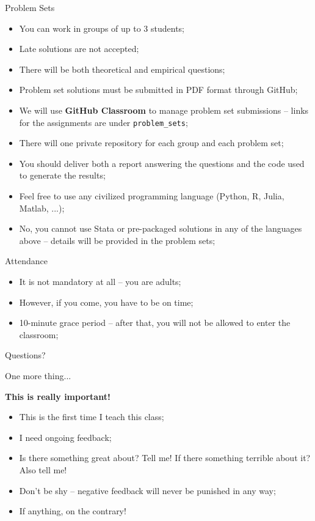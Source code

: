 \documentclass[aspectratio=169, xcolor=dvipsnames, 12pt]{beamer}
\begin{document}
\begin{frame}{Problem Sets}
\begin{itemize}
  \item You can work in groups of up to 3 students;
  \item Late solutions are not accepted;
  \item There will be both theoretical and empirical questions;
  \pause
  \item Problem set solutions must be submitted in PDF format through GitHub;
  \item We will use \textbf{GitHub Classroom} to manage problem set submissions -- links for the assignments are under \texttt{problem\_sets};
  \item There will one private repository for each group and each problem set;
  \item You should deliver both a report answering the questions and the code used to generate the results;
  \pause
  \item Feel free to use any civilized programming language (Python, R, Julia, Matlab, ...);
  \item No, you cannot use Stata or pre-packaged solutions in any of the languages above -- details will be provided in the problem sets;
\end{itemize}
\end{frame}

\begin{frame}{Attendance}
\begin{itemize}
  \item It is not mandatory at all -- you are adults;
  \item However, if you come, you have to be on time;
  \item 10-minute grace period -- after that, you will not be allowed to enter the classroom;
\end{itemize}
  
\end{frame}
\begin{frame}[standout]
Questions?
\end{frame}

\begin{frame}{One more thing...}
  \begin{center}
    \alert{\textbf{This is really important!}}
  \end{center}
  \begin{itemize}
    \item This is the first time I teach this class;
    \item I need ongoing feedback;
    \item Is there something great about? Tell me! If there something terrible about it? Also tell me!
    \item Don't be shy -- negative feedback will never be punished in any way;
    \item If anything, on the contrary!
  \end{itemize}
\end{frame}
\end{document}
